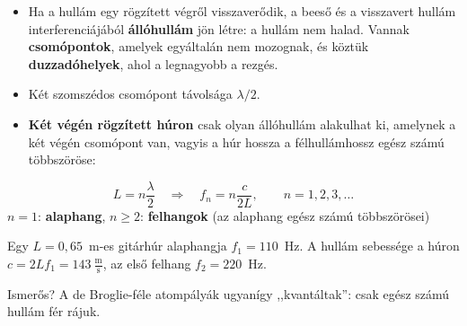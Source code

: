 \documentclass[12pt]{article}
\newcommand{\dia}[1]{\newpage{\Large\bfseries #1}\par\vspace{2pt}{\color{blue!50!black}\hrule height 1pt}\vspace{8pt}}
\begin{document}
\dia{10. Állóhullám}

\begin{minipage}[t]{0.52\linewidth}\vspace{0pt}
\begin{itemize}
  \item Ha a hullám egy rögzített végről visszaverődik, a beeső és a visszavert hullám
    interferenciájából \textbf{állóhullám} jön létre: a hullám nem halad. Vannak
    \textbf{csomópontok}, amelyek egyáltalán nem mozognak, és köztük
    \textbf{duzzadóhelyek}, ahol a legnagyobb a rezgés.
  \item Két szomszédos csomópont távolsága $\lambda/2$.
  \item \textbf{Két végén rögzített húron} csak olyan állóhullám alakulhat ki, amelynek
    a két végén csomópont van, vagyis a húr hossza a félhullámhossz egész számú
    többszöröse:
\end{itemize}
\begin{fontos}
\[ L = n\frac{\lambda}{2} \quad\Longrightarrow\quad f_n = n\frac{c}{2L}, \qquad n = 1, 2, 3, \dots \]
\centering $n = 1$: \textbf{alaphang}, $n \ge 2$: \textbf{felhangok} (az alaphang egész
számú többszörösei)
\end{fontos}
\begin{pelda}
Egy $L = 0{,}65$~m-es gitárhúr alaphangja $f_1 = 110$~Hz. A hullám sebessége a húron
$c = 2Lf_1 = 143~\tfrac{\text{m}}{\text{s}}$, az első felhang $f_2 = 220$~Hz.
\end{pelda}
{\small Ismerős? A de Broglie-féle atompályák ugyanígy ,,kvantáltak'': csak egész számú
hullám fér rájuk.}
\end{minipage}\hfill
\begin{minipage}[t]{0.45\linewidth}\vspace{0pt}\centering
{}
\end{minipage}
\end{document}

